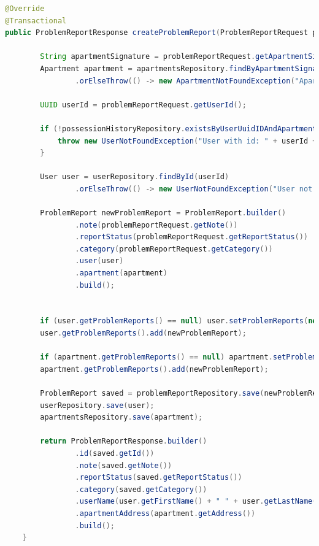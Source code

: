 \begin{lstlisting}[language=Java, style=JavaStyle, caption=Tworzenie zgłoszenia problemu., label=lst:zgloszenie]
@Override
@Transactional
public ProblemReportResponse createProblemReport(ProblemReportRequest problemReportRequest) throws UserNotFoundException, ApartmentNotFoundException {

        String apartmentSignature = problemReportRequest.getApartmentSignature();
        Apartment apartment = apartmentsRepository.findByApartmentSignature(apartmentSignature)
                .orElseThrow(() -> new ApartmentNotFoundException("Apartment not found with id: " + apartmentSignature));

        UUID userId = problemReportRequest.getUserId();

        if (!possessionHistoryRepository.existsByUserUuidIDAndApartmentUuidID(userId, apartment.getUuidID())) {
            throw new UserNotFoundException("User with id: " + userId + " does not have access to apartment with signature: " + apartmentSignature);
        }

        User user = userRepository.findById(userId)
                .orElseThrow(() -> new UserNotFoundException("User not found with id: " + userId));

        ProblemReport newProblemReport = ProblemReport.builder()
                .note(problemReportRequest.getNote())
                .reportStatus(problemReportRequest.getReportStatus())
                .category(problemReportRequest.getCategory())
                .user(user)
                .apartment(apartment)
                .build();


        if (user.getProblemReports() == null) user.setProblemReports(new ArrayList<>());
        user.getProblemReports().add(newProblemReport);

        if (apartment.getProblemReports() == null) apartment.setProblemReports(new ArrayList<>());
        apartment.getProblemReports().add(newProblemReport);

        ProblemReport saved = problemReportRepository.save(newProblemReport);
        userRepository.save(user);
        apartmentsRepository.save(apartment);

        return ProblemReportResponse.builder()
                .id(saved.getId())
                .note(saved.getNote())
                .reportStatus(saved.getReportStatus())
                .category(saved.getCategory())
                .userName(user.getFirstName() + " " + user.getLastName())
                .apartmentAddress(apartment.getAddress())
                .build();
    }
\end{lstlisting}


